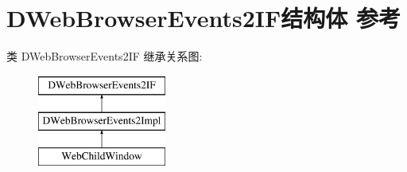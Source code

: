 \hypertarget{struct_d_web_browser_events2_i_f}{}\section{D\+Web\+Browser\+Events2\+I\+F结构体 参考}
\label{struct_d_web_browser_events2_i_f}
类 D\+Web\+Browser\+Events2\+IF 继承关系图\+:\begin{figure}[H]
\begin{center}
\leavevmode
\includegraphics[height=3.000000cm]{struct_d_web_browser_events2_i_f}
\end{center}
\end{figure}
